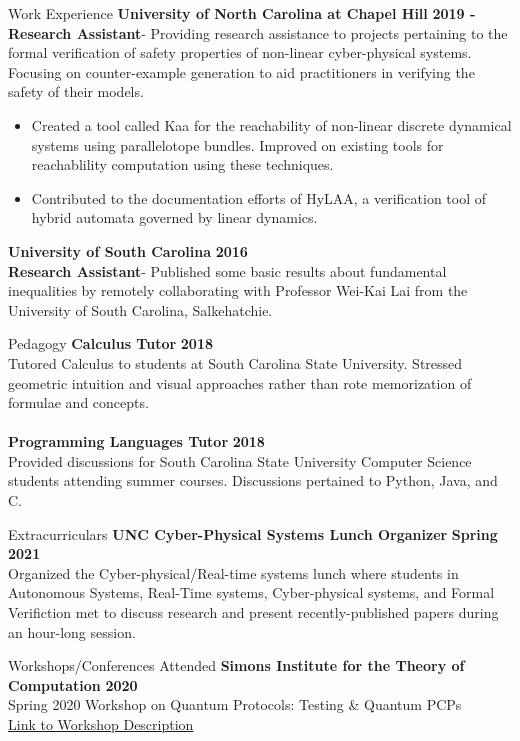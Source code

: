 \documentclass{resume} %
\begin{document}
\begin{rSection}{Work Experience}
{\bf University of North Carolina at Chapel Hill} \hfill {\bf 2019 -} \\
{\bf Research Assistant}- Providing research assistance to projects pertaining to the formal verification of safety properties of non-linear cyber-physical systems. Focusing on counter-example generation to aid practitioners in verifying the safety of their models.
\begin{itemize}
\item Created a tool called Kaa for the reachability of non-linear discrete dynamical systems using parallelotope bundles. Improved on existing tools for reachablility computation using these techniques.
\item Contributed to the documentation efforts of HyLAA, a verification tool of hybrid automata governed by linear dynamics.
\end{itemize}

{\bf University of South Carolina} \hfill {\bf 2016} \\
{\bf Research Assistant}- Published some basic results about fundamental inequalities by remotely collaborating with Professor Wei-Kai Lai from the University of South Carolina, Salkehatchie. \\
\end{rSection}

\begin{rSection}{Pedagogy}
{\bf Calculus Tutor} \hfill {\bf 2018} \\
Tutored Calculus to students at South Carolina State University. Stressed geometric intuition and visual approaches rather than rote memorization of formulae and concepts. \\
\\
{\bf Programming Languages Tutor} \hfill {\bf 2018} \\
Provided discussions for South Carolina State University Computer Science students attending summer courses. Discussions pertained to Python, Java, and C. \\
\end{rSection}

\begin{rSection}{Extracurriculars}
  {\bf UNC Cyber-Physical Systems Lunch Organizer} \hfill {\bf Spring 2021}\\
  Organized the Cyber-physical/Real-time systems lunch where students in Autonomous Systems, Real-Time systems, Cyber-physical systems, and Formal Verifiction met to discuss research and present recently-published papers during an hour-long session.
\end{rSection}

\begin{rSection}{Workshops/Conferences Attended}
{\bf Simons Institute for the Theory of Computation} \hfill {\bf 2020} \\
Spring 2020 Workshop on Quantum Protocols: Testing \& Quantum PCPs \\
\href{https://simons.berkeley.edu/workshops/quantum-2020-2}{Link to Workshop Description}
\end{rSection}
\end{document}
